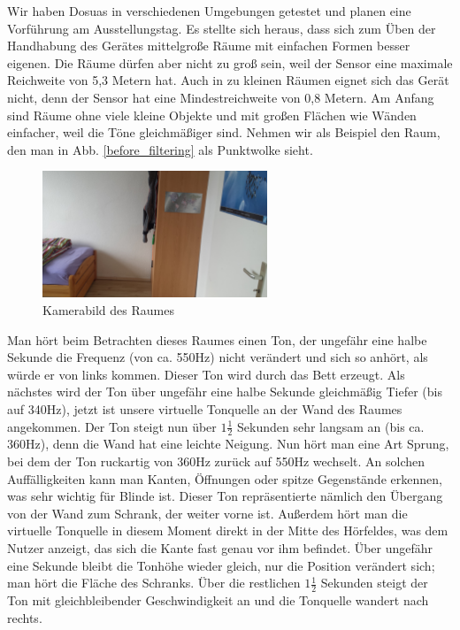 \documentclass[a4paper,12pt,ngerman]{scrartcl}
\begin{document}
Wir haben Dosuas in verschiedenen Umgebungen getestet und planen eine Vorführung am Ausstellungstag.
Es stellte sich heraus, dass sich zum Üben der Handhabung des Gerätes mittelgroße Räume mit einfachen
Formen besser eigenen. Die Räume dürfen aber nicht zu groß sein, weil der Sensor eine maximale Reichweite
von 5,3 Metern hat. Auch in zu kleinen Räumen eignet sich das Gerät nicht, denn der Sensor hat eine  Mindestreichweite von 0,8 Metern. Am Anfang sind Räume ohne viele kleine Objekte und mit großen 
Flächen wie Wänden einfacher, weil die Töne gleichmäßiger sind.
Nehmen wir als Beispiel den Raum, den man in Abb. \ref{before_filtering} als Punktwolke sieht. 
\begin{figure}[h]
	\centering
	\includegraphics[angle=180,width=0.6\textwidth]{20180120_114953}
	\caption{Kamerabild des Raumes}
	\label{normal_picture}
\end{figure} \par
Man hört beim Betrachten dieses Raumes einen Ton, der ungefähr eine halbe Sekunde die Frequenz (von ca. 550Hz) nicht verändert und sich so anhört, als würde er von links kommen. Dieser Ton wird durch das Bett
erzeugt. Als nächstes wird der Ton über ungefähr eine halbe Sekunde gleichmäßig Tiefer (bis auf 340Hz), 
jetzt ist unsere virtuelle Tonquelle an der Wand des Raumes angekommen. Der Ton steigt nun über $1\frac{1}{2}$ Sekunden sehr langsam an (bis ca. 360Hz), denn die Wand hat eine leichte Neigung. 
Nun hört man eine Art Sprung, bei dem der Ton ruckartig von 360Hz zurück auf 550Hz wechselt. An solchen Auffälligkeiten kann man Kanten, Öffnungen oder spitze Gegenstände erkennen, was sehr wichtig für Blinde
ist. Dieser Ton repräsentierte nämlich den Übergang von der Wand zum Schrank, der weiter vorne ist. Außerdem hört
man die virtuelle Tonquelle in diesem Moment direkt in der Mitte des Hörfeldes, was dem Nutzer anzeigt, das sich
die Kante fast genau vor ihm befindet. Über ungefähr eine Sekunde bleibt die Tonhöhe wieder gleich, nur die Position
verändert sich; man hört die Fläche des Schranks. Über die restlichen $1\frac{1}{2}$ Sekunden steigt der Ton mit 
gleichbleibender Geschwindigkeit an und die Tonquelle wandert nach rechts.
\end{document}

